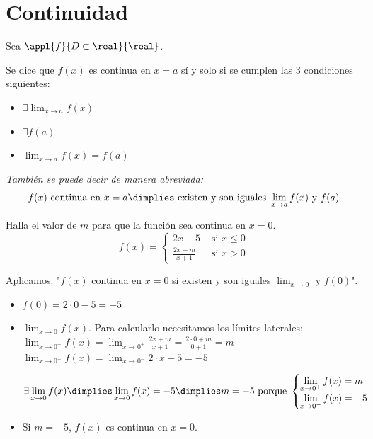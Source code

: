 \section{Continuidad}

\begin{defn}
Sea $\appl{f}{D\subset\real}{\real}$.

Se dice que $f(x)$ es continua en $x=a$ sí y solo si se cumplen las 3 condiciones siguientes:
\begin{itemize}
	\item $\exists \displaystyle\lim_{x\to a} f(x)$
	\item $\exists f(a)$
	\item $\displaystyle\lim_{x\to a}f(x) = f(a)$
\end{itemize}

\textit{También se puede decir de manera abreviada: \[f(x) \text{ continua en } x=a\dimplies \text{ existen y son iguales } \lim_{x\to a}f(x) \text{ y } f(a)\]}
\end{defn}

\begin{problem}
Halla el valor de $m$ para que la función sea continua en $x=0$.
\[f(x) = 
	\begin{cases}
		2x-5 & \text{ si }x\leq 0\\ 
		\frac{2x+m}{x+1} & \text{ si } x>0
	\end{cases}\]
\solution

Aplicamos: "$f(x)$ continua en $x=0$ si existen y son iguales $\displaystyle\lim_{x\to 0}$ y $f(0)$".

\begin{itemize}
	\item $f(0) =  2·0-5 = -5$
	\item $\displaystyle\lim_{x\to0} f(x)$. Para calcularlo necesitamos los límites laterales:
	\subitem $\displaystyle\lim_{x\to0^+} f(x) = \lim_{x\to0^+} \frac{2x+m}{x+1} = \frac{2·0+m}{0+1} = m$
	\subitem $\displaystyle\lim_{x\to0^-} f(x) = \lim_{x\to0^-} 2·x-5 = -5$

	\[\exists\lim_{x\to0}f(x) \dimplies \lim_{x\to 0} f(x) = -5 \dimplies m=-5 \text{ porque } \begin{cases}\displaystyle\lim_{x\to0^+}f(x) = m\\ \displaystyle\lim_{x\to0^-}f(x) = -5\end{cases}\]
	\item Si $m=-5$, $f(x)$ es continua en $x=0$.
\end{itemize}

\end{problem}

